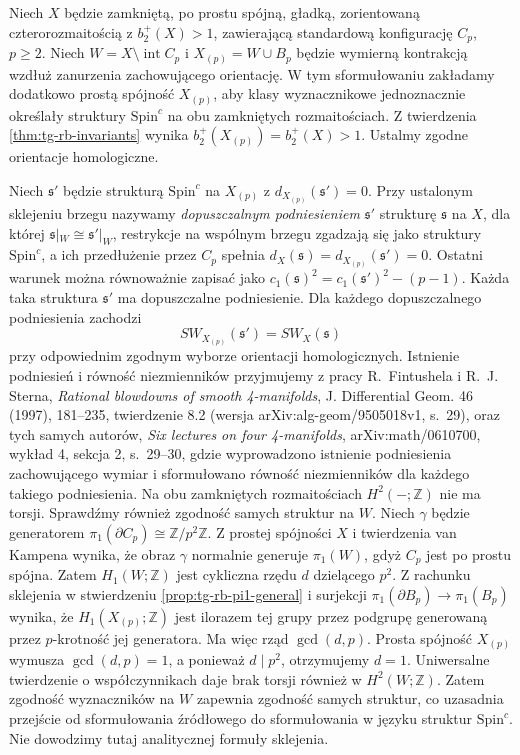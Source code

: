 \begin{twierdzenie}
\label{thm:tg-sw-rbprinciple}
Niech $X$ będzie zamkniętą, po prostu spójną,
gładką, zorientowaną czterorozmaitością z
$b_2^+(X)>1$, zawierającą standardową konfigurację
$C_p$, $p\geq2$. Niech $W=X\setminus\operatorname{int}C_p$
i $X_{(p)}=W\cup B_p$ będzie wymierną kontrakcją
wzdłuż zanurzenia zachowującego orientację.
W tym sformułowaniu zakładamy dodatkowo
prostą spójność $X_{(p)}$, aby klasy wyznacznikowe
jednoznacznie określały struktury $\mathrm{Spin}^c$
na obu zamkniętych rozmaitościach.
Z twierdzenia \ref{thm:tg-rb-invariants} wynika
$b_2^+(X_{(p)})=b_2^+(X)>1$.
Ustalmy zgodne orientacje homologiczne.

Niech $\mathfrak s'$ będzie strukturą $\mathrm{Spin}^c$
na $X_{(p)}$ z $d_{X_{(p)}}(\mathfrak s')=0$.
Przy ustalonym sklejeniu brzegu nazywamy
\emph{dopuszczalnym podniesieniem} $\mathfrak s'$
strukturę $\mathfrak s$ na $X$, dla której
$\mathfrak s|_W\cong\mathfrak s'|_W$, restrykcje na
wspólnym brzegu zgadzają się jako struktury
$\mathrm{Spin}^c$, a ich przedłużenie przez $C_p$
spełnia $d_X(\mathfrak s)=d_{X_{(p)}}(\mathfrak s')=0$.
Ostatni warunek można równoważnie zapisać jako
$c_1(\mathfrak s)^2=c_1(\mathfrak s')^2-(p-1)$.
Każda taka struktura $\mathfrak s'$ ma
dopuszczalne podniesienie. Dla każdego
dopuszczalnego podniesienia zachodzi
\[
SW_{X_{(p)}}(\mathfrak s')=SW_X(\mathfrak s)
\]
przy odpowiednim zgodnym wyborze orientacji homologicznych.
Istnienie podniesień i równość niezmienników
przyjmujemy z pracy R.~Fintushela i R.~J. Sterna,
\emph{Rational blowdowns of smooth 4-manifolds},
J. Differential Geom. 46 (1997), 181--235,
twierdzenie 8.2 (wersja arXiv:alg-geom/9505018v1,
s.~29), oraz tych samych autorów,
\emph{Six lectures on four 4-manifolds},
arXiv:math/0610700, wykład 4, sekcja 2,
s.~29--30, gdzie wyprowadzono istnienie
podniesienia zachowującego wymiar i sformułowano
równość niezmienników dla każdego takiego podniesienia.
Na obu zamkniętych rozmaitościach $H^2(-;\mathbb Z)$
nie ma torsji. Sprawdźmy również zgodność samych
struktur na $W$. Niech $\gamma$ będzie generatorem
$\pi_1(\partial C_p)\cong\mathbb Z/p^2\mathbb Z$.
Z prostej spójności $X$ i twierdzenia van Kampena
wynika, że obraz $\gamma$ normalnie generuje
$\pi_1(W)$, gdyż $C_p$ jest po prostu spójna.
Zatem $H_1(W;\mathbb Z)$ jest cykliczna rzędu
$d$ dzielącego $p^2$. Z rachunku sklejenia
w stwierdzeniu \ref{prop:tg-rb-pi1-general}
i surjekcji $\pi_1(\partial B_p)\to\pi_1(B_p)$
wynika, że $H_1(X_{(p)};\mathbb Z)$ jest ilorazem
tej grupy przez podgrupę generowaną przez
$p$-krotność jej generatora. Ma więc rząd
$\gcd(d,p)$. Prosta spójność $X_{(p)}$ wymusza
$\gcd(d,p)=1$, a ponieważ $d\mid p^2$,
otrzymujemy $d=1$. Uniwersalne twierdzenie
o współczynnikach daje brak torsji również
w $H^2(W;\mathbb Z)$. Zatem zgodność wyznaczników
na $W$ zapewnia zgodność samych struktur,
co uzasadnia przejście od sformułowania źródłowego
do sformułowania w języku struktur $\mathrm{Spin}^c$.
Nie dowodzimy tutaj analitycznej formuły sklejenia.
\end{twierdzenie}

